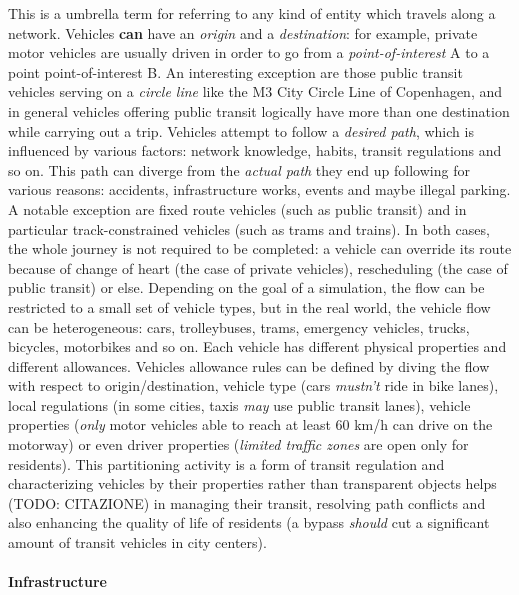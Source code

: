 This is a umbrella term for referring to any kind of entity which travels along a network.
Vehicles \textbf{can} have an \textit{origin} and a \textit{destination}: for example, private motor vehicles are usually driven in order to go from a \textit{point-of-interest} A to a point point-of-interest B.
An interesting exception are those public transit vehicles serving on a \textit{circle line} like the M3 City Circle Line of Copenhagen, and in general vehicles offering public transit logically have more than one destination while carrying out a trip.
Vehicles attempt to follow a \textit{desired path}, which is influenced by various factors: network knowledge, habits, transit regulations and so on.
This path can diverge from the \textit{actual path} they end up following for various reasons: accidents, infrastructure works, events and maybe illegal parking.
A notable exception are fixed route vehicles (such as public transit) and in particular track-constrained vehicles (such as trams and trains).
In both cases, the whole journey is not required to be completed: a vehicle can override its route because of change of heart (the case of private vehicles), rescheduling (the case of public transit) or else.
Depending on the goal of a simulation, the flow can be restricted to a small set of vehicle types, but in the real world, the vehicle flow can be heterogeneous: cars, trolleybuses, trams, emergency vehicles, trucks, bicycles, motorbikes and so on. Each vehicle has different physical properties and different allowances.
Vehicles allowance rules can be defined by diving the flow with respect to origin/destination, vehicle type (cars \textit{mustn't} ride in bike lanes), local regulations (in some cities, taxis \textit{may} use public transit lanes), vehicle properties (\textit{only} motor vehicles able to reach at least 60 km/h can drive on the motorway) or even driver properties (\textit{limited traffic zones} are open only for residents).
This partitioning activity is a form of transit regulation and characterizing vehicles by their properties rather than transparent objects helps (TODO: CITAZIONE) in managing their transit, resolving path conflicts and also enhancing the quality of life of residents (a bypass \textit{should} cut a significant amount of transit vehicles in city centers).

\paragraph{Infrastructure}


